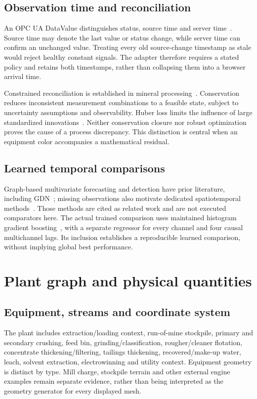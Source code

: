 \documentclass[11pt,a4paper]{article}
\begin{document}
\subsection{Observation time and reconciliation}
An OPC UA DataValue distinguishes status, source time and server time~\cite{datavalue}. Source time may denote the last value or status change, while server time can confirm an unchanged value. Treating every old source-change timestamp as stale would reject healthy constant signals. The adapter therefore requires a stated policy and retains both timestamps, rather than collapsing them into a browser arrival time.

Constrained reconciliation is established in mineral processing~\cite{sadeghi}. Conservation reduces inconsistent measurement combinations to a feasible state, subject to uncertainty assumptions and observability. Huber loss limits the influence of large standardized innovations~\cite{huber}. Neither conservation closure nor robust optimization proves the cause of a process discrepancy. This distinction is central when an equipment color accompanies a mathematical residual.

\subsection{Learned temporal comparisons}
Graph-based multivariate forecasting and detection have prior literature, including GDN~\cite{gdn}; missing observations also motivate dedicated spatiotemporal methods~\cite{gstpro}. Those methods are cited as related work and are not executed comparators here. The actual trained comparison uses maintained histogram gradient boosting~\cite{hgb}, with a separate regressor for every channel and four causal multichannel lags. Its inclusion establishes a reproducible learned comparison, without implying global best performance.

\section{Plant graph and physical quantities}
\subsection{Equipment, streams and coordinate system}
The plant includes extraction/loading context, run-of-mine stockpile, primary and secondary crushing, feed bin, grinding/classification, rougher/cleaner flotation, concentrate thickening/filtering, tailings thickening, recovered/make-up water, leach, solvent extraction, electrowinning and utility context. Equipment geometry is distinct by type. Mill charge, stockpile terrain and other external engine examples remain separate evidence, rather than being interpreted as the geometry generator for every displayed mesh.
\end{document}
